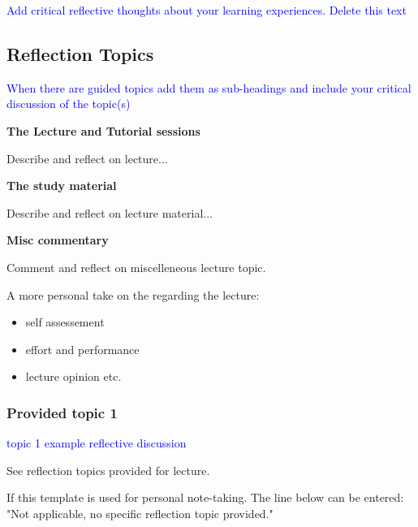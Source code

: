 {\textcolor{blue}{Add critical reflective thoughts about your learning experiences. Delete this text}}



\subsection{Reflection Topics}

{\textcolor{blue}{When there are guided topics add them as sub-headings and include your critical discussion of the topic(s)}}

{\bfseries{The Lecture and Tutorial sessions}}

\begin{followup}
    Describe and reflect on lecture...
\end{followup}

{\bfseries{The study material}}


\begin{followup}
    Describe and reflect on lecture material...
\end{followup}

{\bfseries{Misc commentary}}


\begin{followup}
    Comment and reflect on miscelleneous lecture topic.

    A more personal take on the regarding the lecture:
    \begin{itemize}
        \item self assessement
        \item effort and performance
        \item lecture opinion etc.
    \end{itemize}
\end{followup}


\subsubsection{Provided topic 1}

{\textcolor{blue}{topic 1 example reflective discussion}}

\begin{followup}[]
    See reflection topics provided for lecture.

    If this template is used for personal note-taking. The line below can be entered:
    "Not applicable, no specific reflection topic provided."
\end{followup}


